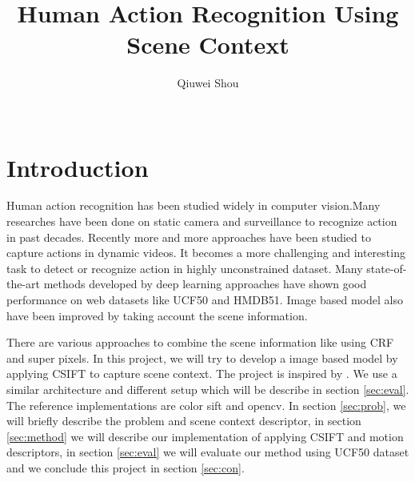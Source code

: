 \documentclass{sig-alternate-05-2015}
\begin{document}

\title{Human Action Recognition Using Scene Context}
\author{
  \alignauthor Qiuwei Shou\\
  \\
}
\makeatletter
\def\@copyrightspace{\relax}
\makeatother

\maketitle

\section{Introduction}
Human action recognition has been studied widely in computer vision.Many researches have been done on static camera and surveillance to recognize action in past decades.
Recently more and more approaches have been studied to capture actions in dynamic videos. It becomes a more challenging and interesting task to detect or recognize action in highly unconstrained dataset.
Many state-of-the-art methods developed by deep learning approaches have shown good performance on web datasets like UCF50 and  HMDB51. 
Image based model also have been improved by taking account the scene information.\par
There are various approaches to combine the scene information like using CRF and super pixels. In this project, we will try to develop a image based model by applying CSIFT\cite{vandeSandeTPAMI2010} to capture scene context.
The project is inspired by \cite{Reddy:2013:RHA:2508580.2508584}. We use a similar architecture and different setup which will be describe in section \ref{sec:eval}. 
The reference implementations are color sift \cite{vandeSandeTPAMI2010} and opencv\cite{opencv}.
In section \ref{sec:prob}, we will briefly describe the problem and scene context descriptor,
in section \ref{sec:method} we will describe our implementation of applying CSIFT and motion descriptors,
in section \ref{sec:eval} we will evaluate our method using UCF50 dataset\cite{ucf50}
and we conclude this project in section \ref{sec:con}.
\end{document}
